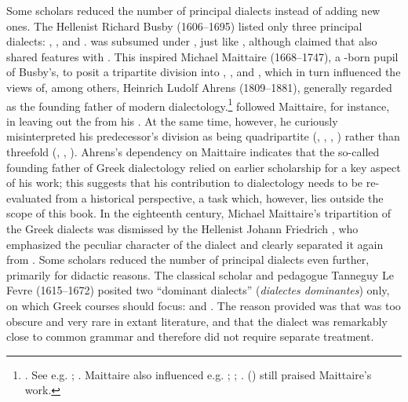 Some scholars reduced the number of principal dialects instead of adding new ones. The  Hellenist Richard Busby (1606–1695) listed only three principal dialects: , , and .  was subsumed under , just like , although \citet[66--67]{Busby1696} claimed that  also shared features with . This inspired Michael Maittaire (1668–1747), a -born pupil of Busby’s, to posit a tripartite division into , , and , which in turn influenced the views of, among others, Heinrich Ludolf Ahrens (1809–1881), generally regarded as the founding father of modern  dialectology.\footnote{\citet[i–ii]{Maittaire1706}. See e.g. \citet[177]{Brekle1992}; \citet[463]{Finkelberg2014}. Maittaire also influenced e.g. \citet[213]{Thompson1732}; \citet[162]{Gesner1774}; \citet[\textsc{xxviii}]{Harles1778}. \citeauthor{Pott1974} (\citeyear[92]{Pott1974}) still praised Maittaire’s work.} \citet[1]{Ahrens1839} followed Maittaire, for instance, in leaving out the  from his . At the same time, however, he curiously misinterpreted his predecessor’s division as being quadripartite (, , , ) rather than threefold (, , ). Ahrens’s dependency on Maittaire indicates that the so-called founding father of Greek dialectology relied on earlier scholarship for a key aspect of his work; this suggests that his contribution to  dialectology needs to be re-evaluated from a historical perspective, a task which, however, lies outside the scope of this book. In the eighteenth century, Michael Maittaire’s tripartition of the Greek dialects was dismissed by the  Hellenist Johann Friedrich \citet[\textsc{iv–v}]{Facius1782}, who emphasized the peculiar character of the  dialect and clearly separated it again from . Some scholars reduced the number of principal dialects even further, primarily for didactic reasons. The  classical scholar and pedagogue Tanneguy Le Fevre (1615–1672) posited two “dominant dialects” (\textit{dialectes dominantes}) only, on which Greek courses should focus:  and . The reason \citet[61]{Le1731} provided was that  was too obscure and very rare in extant literature, and that the  dialect was remarkably close to common grammar and therefore did not require separate treatment.

